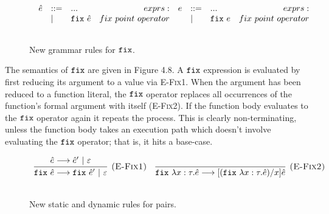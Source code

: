 \begin{figure}[h]

\[
\begin{array}{c}

\begin{array}{lllr}

\hat e & ::= & ... & exprs: \\
	& | & \mathtt{fix}~ \hat e & fix~point~operator \\
	&&\\

\end{array}

\begin{array}{lllr}

e & ::= & ... & exprs: \\
	& | & \mathtt{fix}~ e & fix~point~operator \\
	&&\\

\end{array}

\end{array}
\]

\vspace{-12pt}
\caption{New grammar rules for $\mathtt{fix}$.}
\label{A sample. }
\end{figure}


The semantics of $\mathtt{fix}$ are given in Figure 4.8. A $\mathtt{fix}$ expression is evaluated by first reducing its argument to a value via \textsc{E-Fix1}. When the argument has been reduced to a function literal, the $\mathtt{fix}$ operator replaces all occurrences of the function's formal argument with itself (\textsc{E-Fix2}). If the function body evaluates to the $\mathtt{fix}$ operator again it repeats the process. This is clearly non-terminating, unless the function body takes an execution path which doesn't involve evaluating the $\mathtt{fix}$ operator; that is, it hits a base-case.


\begin{figure}[h]

\[
\begin{array}{c}

\infer[\textsc{(E-Fix1)}]
	{\fix{\hat e} \longrightarrow \fix{\hat e'}~|~\varepsilon}
	{\hat e \longrightarrow \hat e'~|~\varepsilon}
~~~
\infer[\textsc{(E-Fix2)}]
	{\fix{\lambda x: \tau. \hat e} \longrightarrow [(\fix{\lambda x: \tau. \hat e})/x] \hat e}
	{}\\[3ex]
	
\end{array}
\]
	
\vspace{-12pt}
\caption{New static and dynamic rules for pairs.}
\label{A sample. }
\end{figure}


